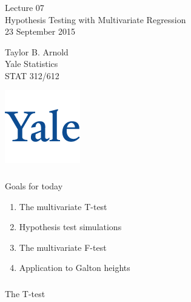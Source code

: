 



\begin{frame}[fragile] \frametitle{}

\vfill

{\fontsize{0.7cm}{0cm}\selectfont Lecture 07 \\\vspace{0.2cm}
Hypothesis Testing with Multivariate Regression}\\\vspace{0.5cm}
23 September 2015

\vspace{2cm}

\begin{minipage}{0.6\textwidth}
Taylor B. Arnold \\
Yale Statistics \\
STAT 312/612
\end{minipage}
\hfill
\begin{minipage}{0.3\textwidth}\raggedleft
\includegraphics[scale=0.3]{../yale-logo.png}
\end{minipage}%

\end{frame}

\begin{frame}[fragile] \frametitle{}

{\color{yaleblue}\fontsize{16pt}{20pt}\selectfont Goals for today}

\begin{enumerate}
\item The multivariate T-test
\item Hypothesis test simulations
\item The multivariate F-test
\item Application to Galton heights
\end{enumerate}

\end{frame}

\begin{frame}[fragile] \frametitle{}

\begin{flushright}
{\color{yaleblue}\sc\fontsize{1cm}{0cm}\selectfont The T-test}
\end{flushright}

\end{frame}

